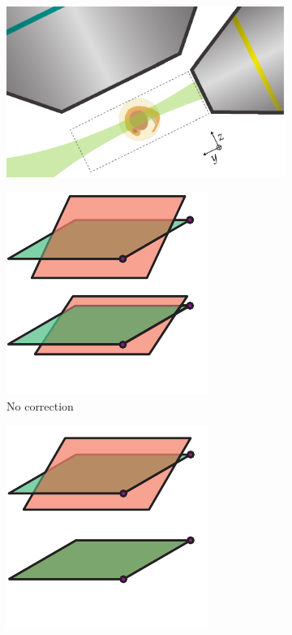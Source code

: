 \begin{figure}
	\centering
    \begin{subfigure}[t]{\textwidth}
        \centering
        \includegraphics{geometry/Schematic_thesis}
        \caption{}
        \label{fig:geometry/Schematic_thesis}
    \end{subfigure}\hfill
    \begin{subfigure}[t]{0.2\textwidth}
        \centering
        \includegraphics{geometry/no_correction}
        \caption{No correction}
        \label{fig:geometry/no_correction}
    \end{subfigure}\hfill
    \begin{subfigure}[t]{0.2\textwidth}
        \centering
        \includegraphics{geometry/linear}

\end{subfigure}
\end{figure}
